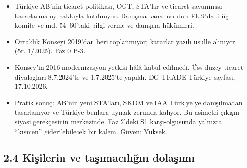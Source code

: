 \begin{itemize}
\tightlist
\item
  Türkiye AB'nin ticaret politikası, OGT, STA'lar ve ticaret savunması kararlarına oy hakkıyla katılmıyor. Danışma kanalları dar: Ek 9'daki üç komite ve md. 54--60'taki bilgi verme ve danışma hükümleri. \etiketV{}
\item
  Ortaklık Konseyi 2019'dan beri toplanmıyor; kararlar yazılı usulle alınıyor (ör. 1/2025). \etiketV{} Faz 0 B-3.
\item
  Konsey'in 2016 modernizasyon yetkisi hâlâ kabul edilmedi. Üst düzey ticaret diyalogları 8.7.2024'te ve 1.7.2025'te yapıldı. \etiketV{} DG TRADE Türkiye sayfası, 17.10.2026.
\item
  Pratik sonuç: AB'nin yeni STA'ları, SKDM ve IAA Türkiye'ye danışılmadan tasarlanıyor ve Türkiye bunlara uymak zorunda kalıyor. Bu asimetri çıkışın siyasi gerekçesinin merkezinde. Faz 2'deki S1 karşı-olgusunda yalnızca ``kısmen'' giderilebilecek bir kalem. \etiketH{} Güven: Yüksek.
\end{itemize}

\hypertarget{01_teshis-24-kiux15filerin-ve-taux15fux131macux131lux131ux11fux131n-dolaux15fux131mux131}{%
\subsection{2.4 Kişilerin ve taşımacılığın dolaşımı}\label{01_teshis-24-kiux15filerin-ve-taux15fux131macux131lux131ux11fux131n-dolaux15fux131mux131}}


